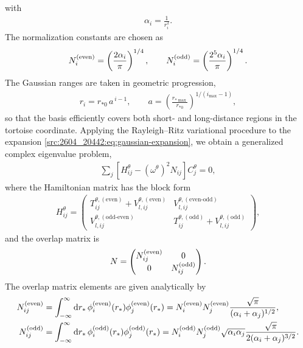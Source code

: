 with
\begin{align}
    \alpha_i = \frac{1}{r_i^2}.
\end{align}
The normalization constants are chosen as
\begin{align}
    N^{\mathrm{(even)}}_i
    = \left( \frac{2\alpha_i}{\pi} \right)^{1/4},
    \qquad
    N^{\mathrm{(odd)}}_i
    = \left( \frac{2^{5}\alpha_i}{\pi} \right)^{1/4}.
\end{align}
The Gaussian ranges are taken in geometric progression,
\begin{align}
    r_i = r_{*0}\, a^{\,i-1},
    \qquad
    a = \left( \frac{r_{*\max}}{r_{*0}} \right)^{1/(i_{\max}-1)},
    \label{src:2604_20442:eq:gaussian-ranges}
\end{align}
so that the basis efficiently covers both short- and long-distance regions in the tortoise coordinate.
Applying the Rayleigh--Ritz variational procedure to the expansion
\eqref{src:2604_20442:eq:gaussian-expansion}, we obtain a generalized complex eigenvalue
problem,
\begin{align}
    \sum_j \left[ H_{ij}^\theta - (\omega^\theta)^2 N_{ij} \right]
    C_j^\theta
    = 0,
    \label{src:2604_20442:eq:generalized-evp-gaussian}
\end{align}
where the Hamiltonian matrix has the block form
\begin{align}
    H_{ij}^\theta
    =
    \begin{pmatrix}
        T_{ij}^{\theta,\mathrm{(even)}}
        +
        V_{l,ij}^{\theta,\mathrm{(even)}}
        &
        V_{l,ij}^{\theta,\mathrm{(even\mbox{-}odd)}}
        \\
        V_{l,ij}^{\theta,\mathrm{(odd\mbox{-}even)}}
        &
        T_{ij}^{\theta,\mathrm{(odd)}}
        +
        V_{l,ij}^{\theta,\mathrm{(odd)}}
    \end{pmatrix},
\end{align}
and the overlap matrix is
\begin{align}
    N =
    \begin{pmatrix}
        N^{\mathrm{(even)}}_{ij} & 0 \\
        0 & N^{\mathrm{(odd)}}_{ij}
    \end{pmatrix}.
\end{align}
The overlap matrix elements are given analytically by
\begin{align}
    N^{\mathrm{(even)}}_{ij}
    &= \int_{-\infty}^{\infty} \mathrm{d} r_*\,
    \phi^{\mathrm{(even)}}_i(r_*) \phi^{\mathrm{(even)}}_j(r_*)
    = N^{\mathrm{(even)}}_i N^{\mathrm{(even)}}_j
    \frac{\sqrt{\pi}}{(\alpha_i+\alpha_j)^{1/2}},
    \\
    N_{ij}^{\mathrm{(odd)}}
    &= \int_{-\infty}^{\infty} \mathrm{d} r_*\,
    \phi^{\mathrm{(odd)}}_i(r_*) \phi^{\mathrm{(odd)}}_j(r_*)
    = N^{\mathrm{(odd)}}_i N^{\mathrm{(odd)}}_j \sqrt{\alpha_i\alpha_j}
    \frac{\sqrt{\pi}}{2(\alpha_i+\alpha_j)^{3/2}}.
\end{align}
